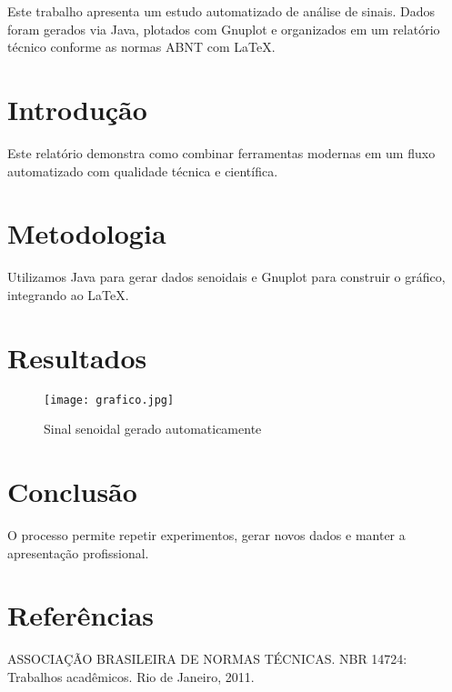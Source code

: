 \documentclass[12pt,oneside]{abntex2}
\begin{document}
\imprimircapa
\imprimirfolhaderosto
\tableofcontents
\listoffigures
\cleardoublepage

\begin{resumo}
Este trabalho apresenta um estudo automatizado de análise de sinais. Dados foram gerados via Java, plotados com Gnuplot e organizados em um relatório técnico conforme as normas ABNT com \LaTeX.
\end{resumo}

\section{Introdução}
Este relatório demonstra como combinar ferramentas modernas em um fluxo automatizado com qualidade técnica e científica.

\section{Metodologia}
Utilizamos Java para gerar dados senoidais e Gnuplot para construir o gráfico, integrando ao \LaTeX.

\section{Resultados}
\begin{figure}[H]
\centering
\texttt{[image: grafico.jpg]}
\caption{Sinal senoidal gerado automaticamente}
\end{figure}

\section{Conclusão}
O processo permite repetir experimentos, gerar novos dados e manter a apresentação profissional.

\section*{Referências}

\noindent
[1] ASSOCIAÇÃO BRASILEIRA DE NORMAS TÉCNICAS. NBR 14724: Trabalhos acadêmicos. Rio de Janeiro, 2011.
\end{document}
